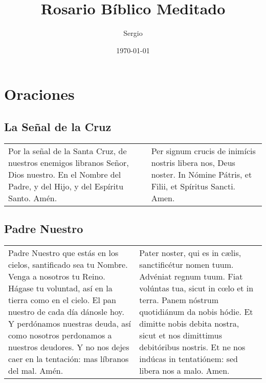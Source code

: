 \documentclass[11pt,a4paper]{book}
\title{Rosario Bíblico Meditado}
\author{Sergio}
\date{\today}
\begin{document}
    \begin{titlepage}
    \maketitle        
    \end{titlepage}

    \chapter*{Oraciones}

    \section*{La Señal de la Cruz}\label{sec:senal-cruz}
    \begin{longtable} { p{} p{} }
        Por la señal de la Santa Cruz, de nuestros enemigos libranos Señor, Dios nuestro. En el Nombre del Padre, 
        y del Hijo, y del Espíritu Santo. Amén.
        
        &
        
        Per signum crucis de inimícis nostris libera nos, Deus noster. In Nómine Pátris, et Filii, et Spíritus Sancti. Amen.
    \end{longtable}

    \section*{Padre Nuestro}\label{sec:paternoster}
    \begin{longtable} { p{} p{} }
        Padre Nuestro que estás en los cielos, santificado sea tu Nombre. Venga a nosotros tu Reino. 
        Hágase tu voluntad, así en la tierra como en el cielo. El pan nuestro de cada día dánosle hoy. 
        Y perdónamos nuestras deuda, así como nosotros perdonamos a nuestros deudores. 
        Y no nos dejes caer en la tentación: mas líbranos del mal. Amén.
        
        &
        
        Pater noster, qui es in cælis, sanctificétur nomen tuum. Advéniat regnum tuum. 
        Fiat volúntas tua, sicut in cœlo et in terra. Panem nóstrum quotidiánum da nobis hódie. 
        Et dimitte nobis debita nostra, sicut et nos dimittimus debitóribus nostris. 
        Et ne nos indúcas in tentatiónem: sed libera nos a malo. Amen.
    \end{longtable}
\end{document}

